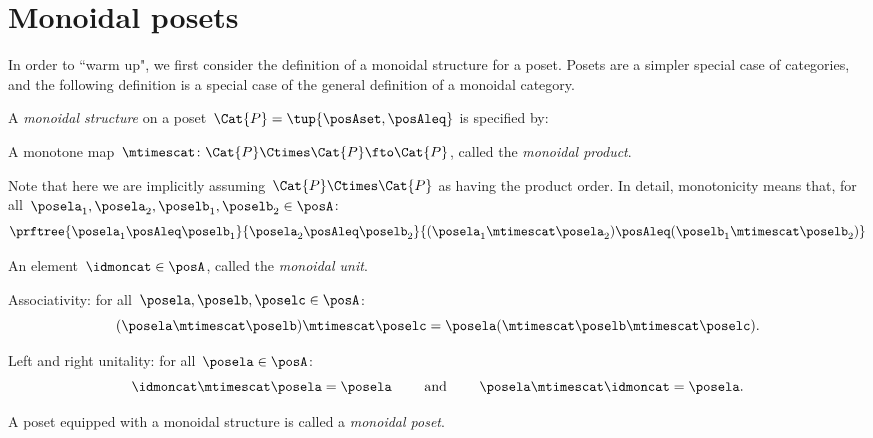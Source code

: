 

\section{Monoidal posets}




In order to ``warm up", we first consider the definition of a monoidal structure for a poset. Posets are a simpler special case of categories, and the following definition is a special case of the general definition of a monoidal category.

\begin{ctdefinition}
    \label{def:monoidal-poset}
    A \emph{monoidal structure} on a poset~$\Cat{P} = \tup{\posAset, \posAleq}$ is specified by:

    \constit
    \begin{compactenum}
        \item A monotone map~$\mtimescat \colon \Cat{P} \Ctimes \Cat{P} \fto \Cat{P}$, called the \emph{monoidal product}.

        \noindent
        Note that here we are implicitly assuming~$\Cat{P} \Ctimes \Cat{P}$ as having the product order.
        In detail, monotonicity means that, for all~$\posela_1, \posela_2, \poselb_1, \poselb_2 \in \posA$:
        \begin{equation}
            \prftree
            {\posela_1 \posAleq \poselb_1}{\posela_2 \posAleq \poselb_2}{ (\posela_1 \mtimescat  \posela_2) \posAleq  (\poselb_1 \mtimescat  \poselb_2)}
        \end{equation}
        \item An element~$\idmoncat \in \posA$, called the \emph{monoidal unit}.
    \end{compactenum}

    \condit
    \begin{compactenum}
        \item Associativity: for all~$\posela, \poselb, \poselc \in \posA$:
        \begin{equation}
        (\posela \mtimescat \poselb)
            \mtimescat \poselc =  \posela ( \mtimescat \poselb \mtimescat \poselc).
        \end{equation}
        \item Left and right unitality: for all~$\posela \in \posA$:
        \begin{equation}
            \idmoncat \mtimescat \posela = \posela \quad \quad \text{ and } \quad \quad \posela \mtimescat \idmoncat = \posela.
        \end{equation}
    \end{compactenum}

    \noindent A poset equipped with a monoidal structure is called a \emph{monoidal poset}.
\end{ctdefinition}

